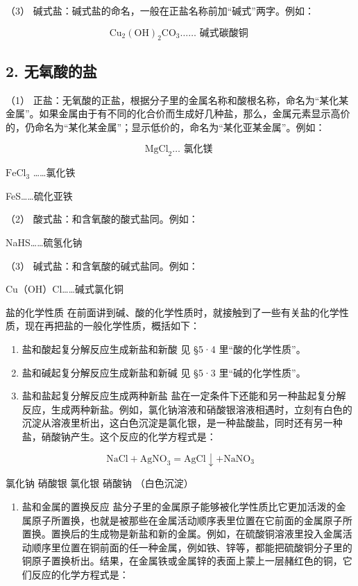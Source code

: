 （3） 碱式盐：碱式盐的命名，一般在正盐名称前加``碱式''两字。例如：

\[
\mathrm{Cu}_{2} (\mathrm{OH}) _ {2} \mathrm{CO}_{3} \dots \dots \text{ 碱式碳酸铜 }
\]

\subsection{2. 无氧酸的盐}

（1）
正盐：无氧酸的正盐，根据分子里的金属名称和酸根名称，命名为``某化某金属''。如果金属由于有不同的化合价而生成好几种盐，那么，金属元素显示高价的，仍命名为``某化某金属''；显示低价的，命名为``某化亚某金属''。例如：

\[
\mathrm{MgCl}_{2} \dots \text{ 氯化镁 }
\]

\(\mathrm{FeCl}_{3}\) \ldots\ldots 氯化铁

FeS\ldots\ldots 硫化亚铁

（2） 酸式盐：和含氧酸的酸式盐同。例如：

NaHS\ldots\ldots 硫氢化钠

（3） 碱式盐：和含氧酸的碱式盐同。例如：

Cu（OH）Cl\ldots\ldots 碱式氯化铜

盐的化学性质
在前面讲到碱、酸的化学性质时，就接触到了一些有关盐的化学性质，现在再把盐的一般化学性质，概括如下：

\begin{enumerate}
\item
  盐和酸起复分解反应生成新盐和新酸 见 §5·4 里``酸的化学性质''。
\item
  盐和碱起复分解反应生成新盐和新碱 见 §5·3 里``碱的化学性质''。
\item
  盐和盐起复分解反应生成两种新盐
  盐在一定条件下还能和另一种盐起复分解反应，生成两种新盐。例如，氯化钠溶液和硝酸银溶液相遇时，立刻有白色的沉淀从溶液里析出，这白色沉淀是氯化银，是一种盐酸盐，同时还有另一种盐，硝酸钠产生。这个反应的化学方程式是：
\end{enumerate}

\[
\mathrm{NaCl} + \mathrm{AgNO}_{3} = \mathrm{AgCl} \downarrow + \mathrm{NaNO}_{3}
\]

氯化钠 硝酸银 氯化银 硝酸钠 （白色沉淀）

\begin{enumerate}[start=4]
\item
  盐和金属的置换反应
  盐分子里的金属原子能够被化学性质比它更加活泼的金属原子所置换，也就是被那些在金属活动顺序表里位置在它前面的金属原子所置换。置换后的生成物是新盐和新的金属。例如，在硫酸铜溶液里投入金属活动顺序里位置在铜前面的任一种金属，例如铁、锌等，都能把硫酸铜分子里的铜原子置换析出。结果，在金属铁或金属锌的表面上蒙上一层赭红色的铜，它们反应的化学方程式是：
\end{enumerate}


